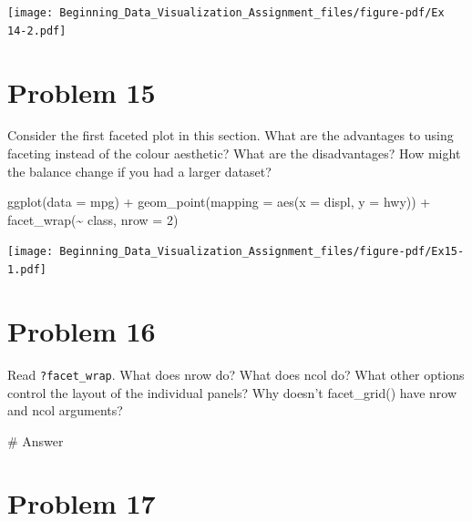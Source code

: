 \documentclass[
  letterpaper,
  DIV=11,
  numbers=noendperiod]{scrreprt}
\newenvironment{Shaded}{\begin{snugshade}}{\end{snugshade}}
\newcommand{\AttributeTok}[1]{\textcolor[rgb]{0.40,0.45,0.13}{#1}}
\newcommand{\CommentTok}[1]{\textcolor[rgb]{0.37,0.37,0.37}{#1}}
\newcommand{\DecValTok}[1]{\textcolor[rgb]{0.68,0.00,0.00}{#1}}
\newcommand{\FunctionTok}[1]{\textcolor[rgb]{0.28,0.35,0.67}{#1}}
\newcommand{\NormalTok}[1]{\textcolor[rgb]{0.00,0.23,0.31}{#1}}
\newcommand{\SpecialCharTok}[1]{\textcolor[rgb]{0.37,0.37,0.37}{#1}}
\begin{document}
\texttt{[image: Beginning\_Data\_Visualization\_Assignment\_files/figure-pdf/Ex 14-2.pdf]}

\section*{Problem 15}\label{problem-15-1}


Consider the first faceted plot in this section. What are the advantages
to using faceting instead of the colour aesthetic? What are the
disadvantages? How might the balance change if you had a larger dataset?

\begin{Shaded}
\begin{Highlighting}[]
\FunctionTok{ggplot}\NormalTok{(}\AttributeTok{data =}\NormalTok{ mpg) }\SpecialCharTok{+} 
  \FunctionTok{geom\_point}\NormalTok{(}\AttributeTok{mapping =} \FunctionTok{aes}\NormalTok{(}\AttributeTok{x =}\NormalTok{ displ, }\AttributeTok{y =}\NormalTok{ hwy)) }\SpecialCharTok{+} 
  \FunctionTok{facet\_wrap}\NormalTok{(}\SpecialCharTok{\textasciitilde{}}\NormalTok{ class, }\AttributeTok{nrow =} \DecValTok{2}\NormalTok{)}
\end{Highlighting}
\end{Shaded}

\texttt{[image: Beginning\_Data\_Visualization\_Assignment\_files/figure-pdf/Ex15-1.pdf]}

\section*{Problem 16}\label{problem-16-1}


Read \texttt{?facet\_wrap}. What does nrow do? What does ncol do? What
other options control the layout of the individual panels? Why doesn't
facet\_grid() have nrow and ncol arguments?

\begin{Shaded}
\begin{Highlighting}[]
\CommentTok{\# Answer}
\end{Highlighting}
\end{Shaded}

\section*{Problem 17}\label{problem-17-1}
\end{document}
